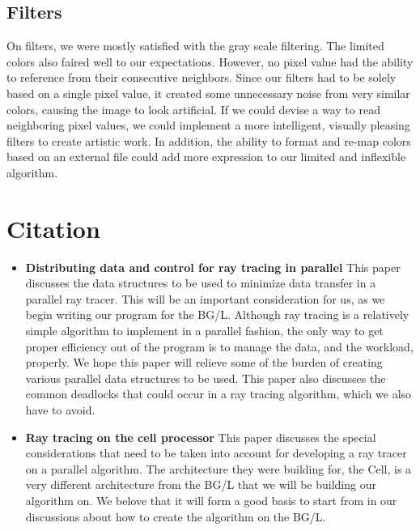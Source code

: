 \documentclass{acmsiggraph}
\begin{document}
\subsection{Filters}
On filters, we were mostly satisfied with the gray scale filtering.  The
limited colors also faired well to our expectations. However, no pixel value had
the ability to reference from their consecutive neighbors.  Since our filters had
to be solely based on a single pixel value, it created some unnecessary noise from
very similar colors, causing the image to look artificial.  If we could devise a
way to read neighboring pixel values, we could implement a more intelligent,
visually pleasing filters to create artistic work.  In addition, the ability
to format and re-map colors based on an external file could add more expression
to our limited and inflexible algorithm.


\section{Citation}

\begin{itemize}
\item
\textbf{Distributing data and control for ray tracing in parallel} This paper
discusses the data structures to be used to minimize data transfer in a parallel
ray tracer. This will be an important consideration for us, as we begin writing
our program for the BG/L. Although ray tracing is a relatively
simple algorithm to implement in a parallel fashion, the only way to get proper
efficiency out of the program is to manage the data, and the workload, properly.
We hope this paper will relieve some of the burden of creating various parallel
data structures to be used. This paper also discusses the common deadlocks that
could occur in a ray tracing algorithm, which we also have to
avoid.\cite{badouel1994dda}
\item
\textbf{Ray tracing on the cell processor} This paper discusses the special
considerations that need to be taken into account for developing a ray tracer on
a parallel algorithm. The architecture they were building for, the Cell, is a
very different architecture from the BG/L that we will be building our algorithm
on. We belove that it will form a good basis to start from in our discussions
about how to create the algorithm on the BG/L.\cite{benthin2006rtc}
\end{itemize}



\end{document}
